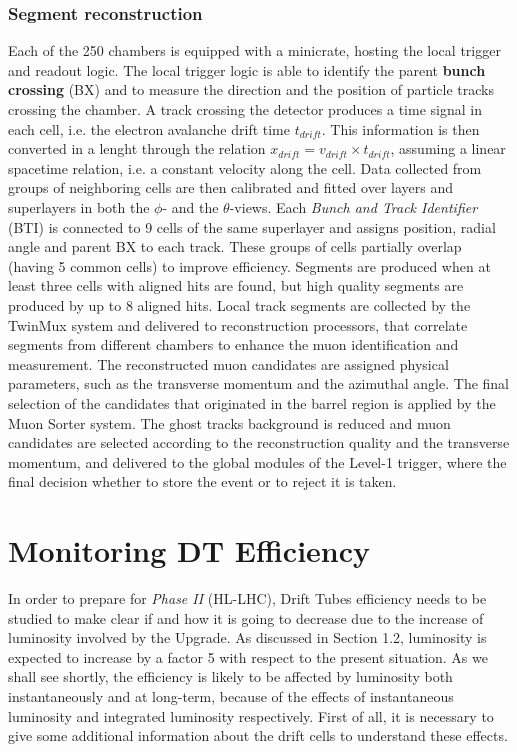 \documentclass[12pt,twoside,a4paper]{report}
\numberwithin{equation}{section}
\begin{document}
\subsection{Segment reconstruction}
Each of the 250 chambers is equipped with a minicrate, hosting the local trigger and readout logic. The local trigger logic is able to identify the parent \textbf{bunch crossing} (BX) and to measure the direction and the position of particle tracks crossing the chamber.
A track crossing the detector produces a time signal in each cell, i.e. the electron avalanche drift time $t_{drift}$. This information is then converted in a lenght through the relation $x_{drift} = v_{drift} \times t_{drift}$, assuming a linear spacetime relation, i.e. a constant velocity along the cell.
Data collected from groups of neighboring cells are then calibrated and fitted over layers and superlayers in both the $\phi$- and the $\theta$-views.
Each \textit{Bunch and Track Identifier} (BTI) is connected to 9 cells of the same superlayer and assigns position, radial angle and parent BX to each track. These groups of cells partially overlap (having 5 common cells) to improve efficiency.
Segments are produced when at least three cells with aligned hits are found, but high quality segments are produced by up to 8 aligned hits.
Local track segments are collected by the TwinMux system and delivered to reconstruction processors, that correlate segments from different chambers to enhance the muon identification and measurement. The reconstructed muon candidates are assigned physical parameters, such as the transverse momentum and the azimuthal angle. The final selection of the candidates that originated in the barrel region is applied by the Muon Sorter system. The ghost tracks background is reduced and muon candidates are selected according to the reconstruction quality and the transverse momentum, and delivered to the global modules of the Level-1 trigger, where the final decision whether to store the event or to reject it is taken. \cite{PhD}

\newpage
\chapter{Monitoring DT Efficiency}
\label{ch:aging}
In order to prepare for \textit{Phase II} (HL-LHC), Drift Tubes efficiency needs to be studied to make clear if and how it is going to decrease due to the increase of luminosity involved by the Upgrade. As discussed in Section 1.2, luminosity is expected to increase by a factor 5 with respect to the present situation.
As we shall see shortly, the efficiency is likely to be affected by luminosity both instantaneously and at long-term, because of the effects of instantaneous luminosity and integrated luminosity respectively.
First of all, it is necessary to give some additional information about the drift cells to understand these effects.
\end{document}

